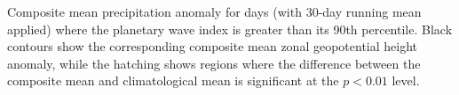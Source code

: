 \label{fig:pr_composite}
Composite mean precipitation anomaly for days (with 30-day running mean applied) where the planetary wave index is greater than its 90th percentile. Black contours show the corresponding composite mean zonal geopotential height anomaly, while the hatching shows regions where the difference between the composite mean and climatological mean is significant at the $p < 0.01$ level.